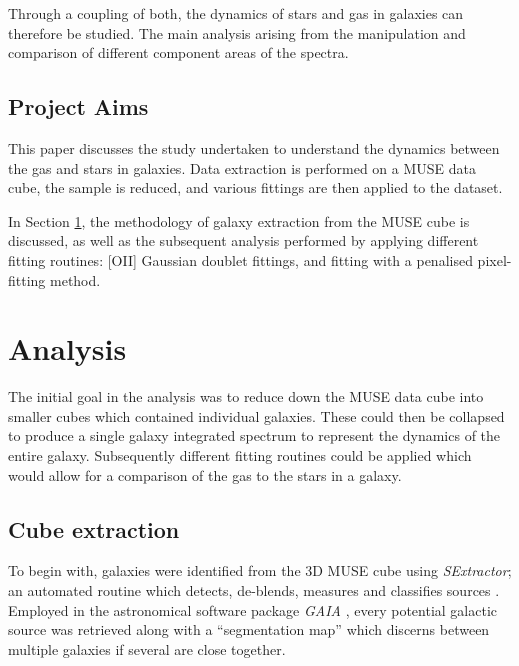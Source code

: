 \documentclass[12pt, twocolumn]{revtex4-1}    %
\begin{document}

Through a coupling of both, the dynamics of stars and gas in galaxies can therefore be studied. The main analysis arising from the manipulation and comparison of different component areas of the spectra.

\subsection{Project Aims}
This paper discusses the study undertaken to understand the dynamics between the gas and stars in galaxies. Data extraction is performed on a MUSE data cube, the sample is reduced, and various fittings are then applied to the dataset.

In Section \ref{sec:analysis}, the methodology of galaxy extraction from the MUSE cube is discussed, as well as the subsequent analysis performed by applying different fitting routines: [OII] Gaussian doublet fittings, and fitting with a penalised pixel-fitting method. 



\section{Analysis} 
\label{sec:analysis}

The initial goal in the analysis was to reduce down the MUSE data cube into smaller cubes which contained individual galaxies. These could then be collapsed to produce a single galaxy integrated spectrum to represent the dynamics of the entire galaxy. Subsequently different fitting routines could be applied which would allow for a comparison of the gas to the stars in a galaxy.

\subsection{Cube extraction}

To begin with, galaxies were identified from the 3D MUSE cube using \textit{SExtractor}; an automated routine which detects, de-blends, measures and classifies sources \citep{bertin_sextractor}. Employed in the astronomical software package \textit{GAIA} \citep{currie_starlink}, every potential galactic source was retrieved along with a ``segmentation map'' which discerns between multiple galaxies if several are close together. 
\end{document}
